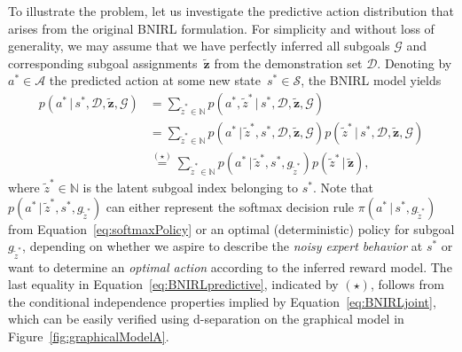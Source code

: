 \documentclass[twoside,11pt]{article}
\newcommand{\p}{p}
\newcommand{\given}{\,\vert\,}
\newcommand{\softmax}{{\pi}}
\newcommand{\eqkomma}{,}
\begin{document}
%
%
%
%
%
%
%
%
%
%
%
%
%
%
%
%
%
To illustrate the problem, let us investigate the predictive action distribution that arises from the original BNIRL formulation. %
For simplicity and without loss of generality, %
we may %
assume that we have 
%
perfectly 
%
inferred all subgoals $\mathcal{G}$ and %
corresponding subgoal assignments~$\mathbf{\tilde{z}}$ from the demonstration set $\mathcal{D}$.
%
%
%
%
%
%
Denoting by $a^*\in\mathcal{A}$ the predicted action %
%
at some new state~$s^*\in\mathcal{S}$, %
the BNIRL model yields
\begin{align}
	\p(a^* \given s^*,\mathcal{D},\mathbf{\tilde{z}},\mathcal{G}) &= \sum_{\tilde{z}^* \in \mathbb{N}} \p(a^*,\tilde{z}^* \given s^*,\mathcal{D},\mathbf{\tilde{z}},\mathcal{G}) \nonumber \\
	&= \sum_{\tilde{z}^* \in \mathbb{N}} \p(a^* \given \tilde{z}^*,s^*,\mathcal{D},\mathbf{\tilde{z}},\mathcal{G}) \p(\tilde{z}^* \given s^*,\mathcal{D},\mathbf{\tilde{z}},\mathcal{G}) \nonumber
	\\ &\stackrel{(\star)}{=} \sum_{\tilde{z}^* \in \mathbb{N}} \p(a^* \given \tilde{z}^*,s^*,g_{\tilde{z}^*}) \p(\tilde{z}^* \given \mathbf{\tilde{z}})  \eqkomma 
	\label{eq:BNIRLpredictive}
\end{align}
where $\tilde{z}^*\in\mathbb{N}$ is the latent subgoal index belonging to $s^*$. Note that $\p(a^* \given \tilde{z}^*,s^*,g_{\tilde{z}^*})$ can either represent the softmax decision rule $\softmax(a^* \given s^*, g_{\tilde{z}^*})$ from Equation~\eqref{eq:softmaxPolicy} or %
an %
optimal (deterministic) policy for subgoal $g_{\tilde{z}^*}$, depending on whether we aspire to %
describe the \textit{noisy expert behavior} at $s^*$ or want to determine %
an \textit{optimal action} according to the inferred reward model. 
%
The last equality in Equation~\eqref{eq:BNIRLpredictive}, indicated by $(\star)$, follows from the conditional independence properties implied by Equation~\eqref{eq:BNIRLjoint}, which can be easily verified using d-separation \citep{koller2009probabilistic} on the graphical model in Figure~\ref{fig:graphicalModelA}. 
\end{document}
